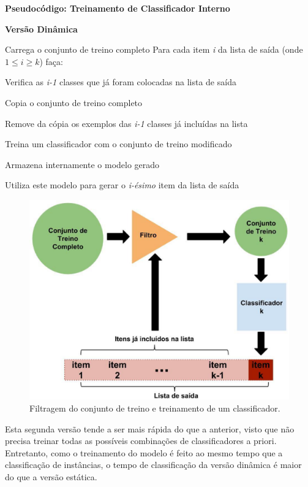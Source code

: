 \hline
\begin{center}
\textbf{Pseudocódigo: Treinamento de Classificador Interno}

\textbf{Versão Dinâmica}
\end{center}
\hline
\hfill \break
Carrega o conjunto de treino completo\newline
Para cada item \textit{i} da lista de saída (onde $1 \leq i \geq k$) faça:

\quad Verifica as \textit{i-1} classes que já foram colocadas na lista de saída

\quad Copia o conjunto de treino completo

\quad Remove da cópia os exemplos das \textit{i-1} classes já incluídas na lista

\quad Treina um classificador com o conjunto de treino modificado

\quad Armazena internamente o modelo gerado

\quad Utiliza este modelo para gerar o \textit{i-ésimo} item da lista de saída
\hline
\hfill \break

\begin{figure}[h!]
  \includegraphics[width=\linewidth]{images/metodoproposto02.eps}
  \caption{Filtragem do conjunto de treino e treinamento de um classificador.}
  \label{fig:metodoproposto02}
\end{figure}

Esta segunda versão tende a ser mais rápida do que a anterior, visto que não precisa treinar todas as possíveis combinações de classificadores a priori. Entretanto, como o treinamento do modelo é feito ao mesmo tempo que a classificação de instâncias, o tempo de classificação da versão dinâmica é maior do que a versão estática. 

